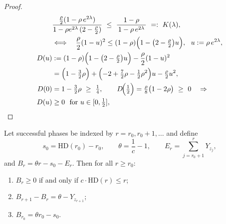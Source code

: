 \begin{proof}
	\begin{align*}
		&\frac{\tfrac{\rho}{2}(1-\rho\,e^{2\lambda})}{1-\rho e^{2\lambda}\,(2-\tfrac{\rho}{2})}
		\  \le\ \frac{1-\rho}{\,1-\rho\,e^{2\lambda}\,}
		\ =:\ K(\lambda),
		\\&\Longleftrightarrow\quad
		\frac{\rho}{2}(1-u)^2 \le (1-\rho)\Bigl(1-\bigl(2-\tfrac{\rho}{2}\bigr)u\Bigr),\ \ u:=\rho\,e^{2\lambda},
		\\
		D(u)
		&:=(1-\rho)\Bigl(1-\bigl(2-\tfrac{\rho}{2}\bigr)u\Bigr)-\frac{\rho}{2}(1-u)^2
		\\&= \Bigl(1-\tfrac{3}{2}\rho\Bigr)+\Bigl(-2+\tfrac{7}{2}\rho-\tfrac{1}{2}\rho^2\Bigr)u-\tfrac{\rho}{2}u^2,
		\\
		D(0)&=1-\tfrac{3}{2}\rho\ \ge\ \tfrac14,\qquad
		D\!\Big(\tfrac12\Big)=\tfrac{\rho}{8}\bigl(1-2\rho\bigr)\ \ge\ 0
		\quad\Rightarrow\quad \\
		D(u)&\ge 0\ \text{ for }u\in[0,\tfrac12],
	\end{align*}
	
	
\end{proof}


\begin{lemma}
	Let successful phases be indexed by $r=r_0,r_0+1,\dots$ and define
	\[
	s_0=\mathrm{HD}(r_0)-r_0, \qquad 
	\theta=\frac{1}{c}-1, \qquad
	E_r=\sum_{j=r_0+1}^{r} Y_{z_j},
	\]
	and $B_r = \theta r - s_0 - E_r$.
	Then for all $r\ge r_0$:
	\begin{enumerate}
		\item 
		$B_r\ge0$ if and only if $c\cdot\mathrm{HD}(r)\le r$;
		\item 
		$B_{r+1}-B_r=\theta-Y_{z_{r+1}}$;
		\item 
		$B_{r_0}=\theta r_0 - s_0$.
	\end{enumerate}
\end{lemma}


